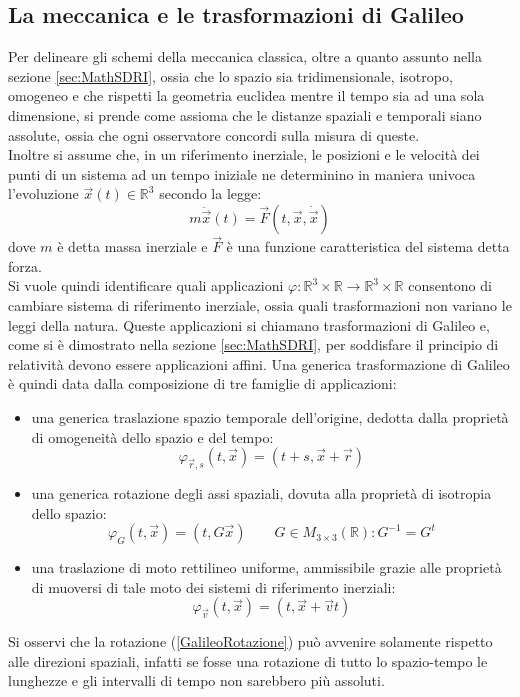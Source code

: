 \subsection{La meccanica e le trasformazioni di Galileo}\label{sec:MC}
Per delineare gli schemi della meccanica classica, oltre a quanto assunto nella sezione \ref{sec:MathSDRI}, ossia che lo spazio sia tridimensionale, isotropo, omogeneo e che rispetti la geometria euclidea mentre il tempo sia ad una sola dimensione, si prende come assioma che le distanze spaziali e temporali siano assolute, ossia che ogni osservatore concordi sulla misura di queste.\\
Inoltre si assume che, in un riferimento inerziale, le posizioni e le velocità dei punti di un sistema ad un tempo iniziale ne determinino in maniera univoca l'evoluzione $\vec x(t)\in \mathbb{R}^3$ secondo la legge:
\begin{equation}
	m\ddot{\vec{x}}(t)=\vec{F}(t,\vec{x},\dot{\vec{x}})
	\label{equazioneDiNewton}
\end{equation}
dove $m$ è detta massa inerziale e $\vec{F}$ è una funzione caratteristica del sistema detta forza.\\

Si vuole quindi identificare quali applicazioni $\varphi:\mathbb{R}^3\times\mathbb{R}\rightarrow
\mathbb{R}^3\times\mathbb{R}$ consentono di cambiare sistema di riferimento inerziale, ossia quali 
trasformazioni non variano le leggi della natura. Queste applicazioni si chiamano trasformazioni di 
Galileo e, come si è dimostrato nella sezione \ref{sec:MathSDRI}, per soddisfare il principio di relatività devono essere applicazioni affini.
Una generica trasformazione di Galileo è quindi data dalla composizione di tre famiglie di applicazioni:
\begin{itemize}
	\item una generica traslazione spazio temporale dell'origine, dedotta dalla proprietà 
	di omogeneità dello spazio e del tempo:
	\begin{equation}
		\varphi_{\vec{r},s}(t,\vec{x})=(t+s,\vec{x}+\vec{r})
		\label{GalileoTraslazoine}
	\end{equation} 
\item una generica rotazione degli assi spaziali, dovuta alla proprietà di isotropia dello spazio:
\begin{equation}
	\varphi_{G}(t,\vec{x})=(t,G\vec{x}) \qquad G\in M_{3\times3}(\mathbb{R}):G^{-1}=G^t
	\label{GalileoRotazione}
\end{equation} 
	\item una traslazione di moto rettilineo uniforme, ammissibile grazie alle proprietà di muoversi di tale moto dei sistemi 
	di riferimento inerziali:
\begin{equation}
	\varphi_{\vec{v}}(t,\vec{x})=(t,\vec{x}+\vec{v}t)
	\label{GalileoVelocità}
\end{equation} 
\end{itemize}
Si osservi che la rotazione (\ref{GalileoRotazione}) può avvenire solamente rispetto alle direzioni spaziali, infatti se fosse una rotazione di tutto lo spazio-tempo le lunghezze e gli intervalli di tempo non sarebbero più assoluti.\\

